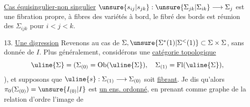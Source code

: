 \uline{Cas équisingulier-non singulier}
$\unsure{s_{ij}|s_{jk}}:\unsure{\Sigma_{jk}|\Sigma_{ik}}\longrightarrow\Sigma_j$ est
une fibration propre, à fibres des variétés
à bord, le fibré des bords est réunion
des $\Sigma_{ijk}$ pour $i<j<k$.

13. \uline{Une digression} Revenons au cas de
$\Sigma,\unsure{\Sigma^{*}(1)|\Sigma^{<}(1)}\subset\Sigma\times\Sigma$, sans donnée de $I$. Plus
généralement, considérons une \uline{catégorie topologique}
\[
\uline{\Sigma}=(\Sigma_{(0)}=\operatorname{Ob}(\uline{\Sigma}),\quad\Sigma_{(1)}=\operatorname{Fl}(\uline{\Sigma}),
\]
), et supposons
que $\uline{s}:\Sigma_{(1)}\longrightarrow\Sigma_{(0)}$ soit \uline{fibrant}. Je dis
qu'alors $\pi_0(\Sigma_{(0)})=\unsure{I_{(0)}|I}$ est \uline{un ens. ordonné},
en prenant comme graphe de la relation
d'ordre l'image de

